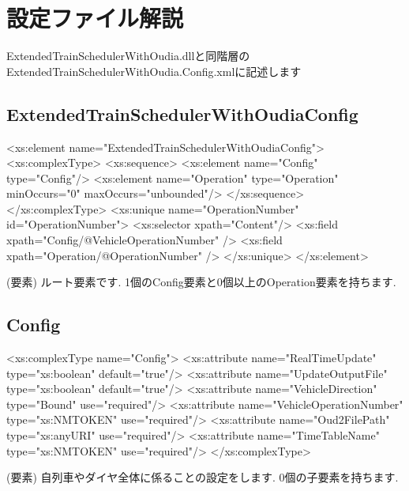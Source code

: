 \documentclass[paper={550pt,2910pt},lualatex , ja=standard]{bxjsreport}
\begin{document}
\section*{設定ファイル解説}

ExtendedTrainSchedulerWithOudia.dllと同階層のExtendedTrainSchedulerWithOudia.Config.xmlに記述します

\subsection*{ExtendedTrainSchedulerWithOudiaConfig}
\begin{refxsdlisting}[title=XSD定義,]
<xs:element name="ExtendedTrainSchedulerWithOudiaConfig">
    <xs:complexType>
        <xs:sequence>
            <xs:element name="Config" type="Config"/>
            <xs:element name="Operation" type="Operation" minOccurs="0" maxOccurs="unbounded"/>
        </xs:sequence>
    </xs:complexType>
    <xs:unique name="OperationNumber" id="OperationNumber">
        <xs:selector xpath="Content"/>
        <xs:field xpath="Config/@VehicleOperationNumber" />
        <xs:field xpath="Operation/@OperationNumber" />
    </xs:unique>
</xs:element>
\end{refxsdlisting}
(要素) ルート要素です. 1個のConfig要素と0個以上のOperation要素を持ちます.
\subsection*{Config}
\begin{refxsdlisting}[title=XSD定義,]
<xs:complexType name="Config">
    <xs:attribute name="RealTimeUpdate" type="xs:boolean" default="true"/>
    <xs:attribute name="UpdateOutputFile" type="xs:boolean" default="true"/>
    <xs:attribute name="VehicleDirection" type="Bound" use="required"/>
    <xs:attribute name="VehicleOperationNumber" type="xs:NMTOKEN" use="required"/>
    <xs:attribute name="Oud2FilePath" type="xs:anyURI" use="required"/>
    <xs:attribute name="TimeTableName" type="xs:NMTOKEN" use="required"/>
</xs:complexType>
\end{refxsdlisting}
(要素) 自列車やダイヤ全体に係ることの設定をします. 0個の子要素を持ちます.
\end{document}
